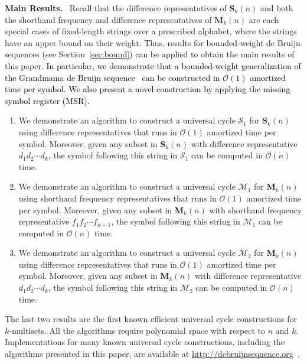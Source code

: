 \documentclass[US-letter,USenglish,authorcolumns,autoref]{lipics-v2021}
\newcommand{\bS}{\mathbf{S}}
\newcommand{\bM}{\mathbf{M}}
\newcommand{\edit}[1]{\textcolor{black}{#1}}
\begin{document}
\noindent
{\bf Main Results.} ~Recall that the
difference representatives of $\bS_k(n)$ and both the shorthand frequency and difference representatives of $\bM_k(n)$ are each special cases of fixed-length strings over a prescribed alphabet, where the strings have an upper bound on their weight.  Thus,   results for bounded-weight de Bruijn sequences (see Section~\ref{sec:bound}) can be applied to obtain the main results of this paper. \edit{ In particular, we demonstrate that a bounded-weight generalization of the Grandmama de Bruijn sequence~\cite{grandma2} can be constructed in $\mathcal{O}(1)$ amortized time per symbol. We also present a novel construction by applying the missing symbol register (MSR).}
%
\begin{enumerate}

    \item We demonstrate an algorithm to construct a universal cycle $\mathcal{S}_1$ for $\bS_k(n)$ using  difference representatives that runs  in $\mathcal{O}(1)$ amortized time per symbol.  Moreover, given any subset in $\bS_k(n)$ with difference representative $d_1d_2\cdots d_k$, the symbol following this string in $\mathcal{S}_1$ can be computed in $\mathcal{O}(n)$ time. 

\smallskip

    \item We demonstrate an algorithm to construct a universal cycle $\mathcal{M}_1$ for $\bM_k(n)$ using  shorthand frequency representatives that runs in $\mathcal{O}(1)$ amortized time per symbol.  Moreover, given any subset in $\bM_k(n)$ with shorthand frequency representative $f_1f_2\cdots f_{n-1}$, the symbol following this string in $\mathcal{M}_1$ can be computed in $\mathcal{O}(n)$ time.  

    \item We demonstrate an algorithm to construct a universal cycle $\mathcal{M}_2$ for $\bM_k(n)$ using difference representatives that runs in $\mathcal{O}(1)$ amortized time per symbol.  Moreover, given any subset in $\bM_k(n)$ with difference representative $d_1d_2\cdots d_{k}$, the symbol following this string in $\mathcal{M}_2$ can be computed in $\mathcal{O}(n)$ time. 
\end{enumerate}
%
\noindent
The last two results are the first known efficient universal cycle constructions for $k$-multisets. 
%
All the algorithms require polynomial space with respect to $n$ and $k$.
 Implementations for many known universal cycle constructions, including the algorithms presented in this paper, are available at \url{http://debruijnsequence.org}~\cite{dbseq}.
\end{document}

